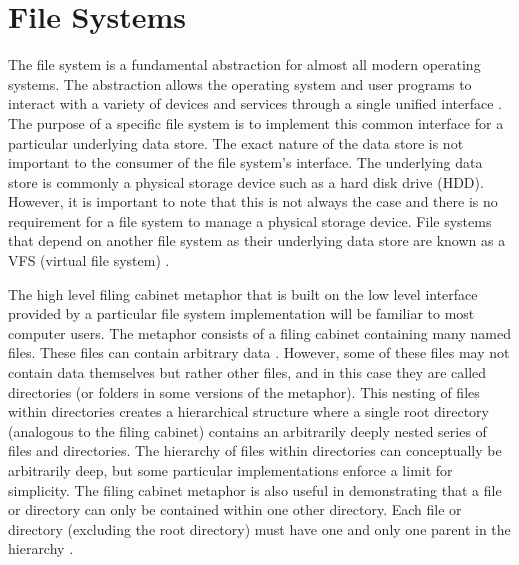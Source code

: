 \chapter{File Systems}
\vspace{1cm}

The file system is a fundamental abstraction for almost all modern operating
systems. The abstraction allows the operating system and user programs to
interact with a variety of devices and services through a single unified
interface \cite{unix-intro}.
The purpose of a specific file system is to implement this common interface for
a particular underlying data store. The exact nature of the data store is not
important to the consumer of the file system's interface. The underlying data
store is commonly a physical storage device such as a hard disk drive (HDD).
However, it is important to note that this is not always the case and there is
no requirement for a file system to manage a physical storage device. File
systems that depend on another file system as their underlying data store are
known as a VFS (virtual file system) \cite{kernel-vfs}.

The high level filing cabinet metaphor that is built on the low level interface
provided by a particular file system implementation will be familiar to most
computer users. The metaphor consists of a filing cabinet containing many named
files. These files can contain arbitrary data \cite{unix-intro}. However, some
of these files may not contain data themselves but rather other files, and in
this case they are called directories (or folders in some versions of the
metaphor). This nesting of files within directories creates a hierarchical
structure where a single root directory (analogous to the filing cabinet)
contains an arbitrarily deeply nested series of files and directories. The
hierarchy of files within directories can conceptually be arbitrarily deep, but
some particular implementations enforce a limit for simplicity. The filing
cabinet metaphor is also useful in demonstrating that a file or directory can
only be contained within one other directory. Each file or directory (excluding
the root directory) must have one and only one parent in the hierarchy
\cite{unix-intro}.

